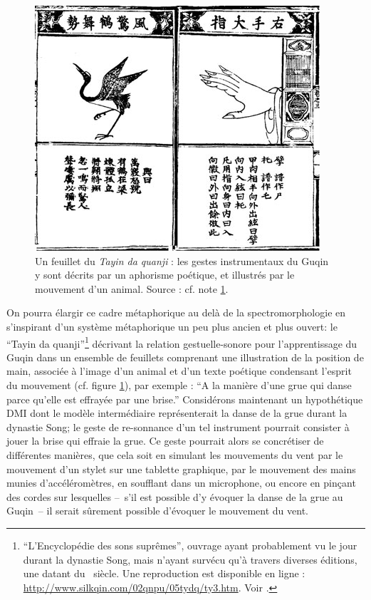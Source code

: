 \begin{figure}[!t]
	\captionsetup{format=plain}%
	\includegraphics[width=\textwidth]{gfx/03_gesture/Guqin-hand01w.jpg}
	\caption[Le Tayin da quanji : métaphore poétique et animale dans la pédagogie du Guqin]{Un feuillet du \textit{Tayin da quanji} : les gestes instrumentaux du Guqin y sont décrits par un aphorisme poétique, et illustrés par le mouvement d'un animal. Source : cf. note \ref{fn:guqin}.}
	\label{fig:gesture:guqin}
\end{figure}
\indent On pourra élargir ce cadre métaphorique au delà de la spectromorphologie en s'inspirant d'un système métaphorique un peu plus ancien et plus ouvert: le ``Tayin da quanji''\footnote{\label{fn:guqin}``L’Encyclopédie des sons suprêmes'', ouvrage ayant probablement vu le jour durant la dynastie Song, mais n'ayant survécu qu'à travers diverses éditions, une datant du ~siècle. Une reproduction est disponible en ligne : \url{http://www.silkqin.com/02qnpu/05tydq/ty3.htm}. Voir \cite{picard_chine:_1991}.} décrivant la relation gestuelle-sonore pour l'apprentissage du Guqin dans un ensemble de feuillets comprenant une illustration de la position de main, associée à l'image d'un animal et d'un texte poétique condensant l'esprit du mouvement (cf. figure \ref{fig:gesture:guqin}), par exemple : ``A la manière d'une grue qui danse parce qu'elle est effrayée par une brise.'' Considérons maintenant un hypothétique \gls{DMI} dont le modèle intermédiaire représenterait la danse de la grue durant la dynastie Song; le geste de re-sonnance d'un tel instrument pourrait consister à jouer la brise qui effraie la grue. Ce geste pourrait alors se concrétiser de différentes manières, que cela soit en simulant les mouvements du vent par le mouvement d'un stylet sur une tablette graphique, par le mouvement des mains munies d'accéléromètres, en soufflant dans un microphone, ou encore en pinçant des cordes sur lesquelles --~s'il est possible d'y évoquer la danse de la grue au Guqin~-- il serait sûrement possible d'évoquer le mouvement du vent.

